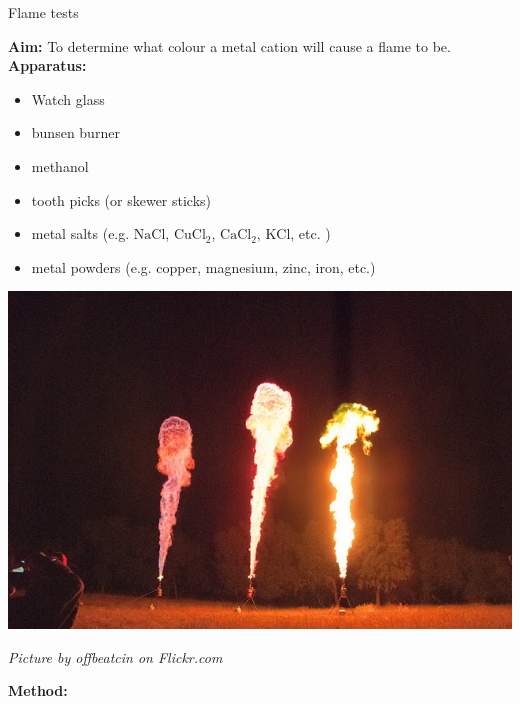 \nopagebreak
\begin{i_experiment}{Flame tests}{
            \nopagebreak
            \label{m38741*eip-699}\noindent{}\textbf{Aim:}\newline
    To determine what colour a metal cation will cause a flame to be. \\
\label{m38741*eip-6991}\noindent{}\textbf{Apparatus:}\newline
\begin{minipage}{.5\textwidth}
\begin{itemize}[noitemsep]
\item Watch glass
\item bunsen burner
\item methanol
\item tooth picks (or skewer sticks)
\item metal salts (e.g. $\text{NaCl}$, ${\text{CuCl}}_{2}$, ${\text{CaCl}}_{2}$, $\text{KCl}$, etc. )
\item metal powders (e.g. copper, magnesium, zinc, iron, etc.)
\end{itemize}
\end{minipage}
\begin{minipage}{.5\textwidth}
\begin{center}
 \includegraphics[width=.8\textwidth]{photos/offbeatcin.jpg}\par
\textit{Picture by offbeatcin on Flickr.com}
\end{center}
\end{minipage}
\label{m38741*eip-6992}\noindent{}\textbf{Method:}\newline
}
\end{i_experiment}
